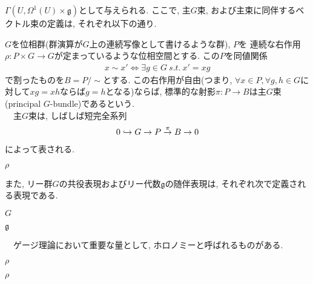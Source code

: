 $\Gamma(U, \Omega^1(U)\times \mathfrak{g})$として与えられる. 
ここで, 主$G$束, および主束に同伴するベクトル束の定義は, それぞれ以下の通り. 
\begin{definition}[主$G$束]
    $G$を位相群(群演算が$G$上の連続写像として書けるような群), $P$を
    連続な右作用$\rho: P\times G \to G$が定まっているような位相空間とする. 
    この$P$を同値関係
    \begin{align}
        x\sim x' \Leftrightarrow \exists g\in G~s.t. ~ x'=xg
    \end{align}
    で割ったものを$B=P/\sim $とする. 
    この右作用が自由(つまり, $\forall x\in P, 
    \forall g, h\in G$に対して$xg=xh$ならば$g=h$となる)ならば, 
    標準的な射影$\pi: P\to B$は主$G$束(principal $G$-bundle)であるという. \\
    　主$G$束は, しばしば短完全系列
    \begin{align}
        0\hookrightarrow G\to P\stackrel{\pi}{\to} B\to 0
    \label{pGbundle}
    \end{align}
    によって表される. 
\end{definition}
\begin{definition}[同伴ベクトル束]
    $\rho$
\end{definition}
また, リー群$G$の共役表現およびリー代数$\mathfrak{g}$の随伴表現は, それぞれ次で定義される表現である. 
\begin{definition}[共役表現]
    $G$
\end{definition}
\begin{definition}[随伴表現]
    $\mathfrak{g}$
\end{definition}
　ゲージ理論において重要な量として, ホロノミーと呼ばれるものがある. 
\begin{definition}[水平持ち上げ]
    $\rho$
\end{definition}
\begin{definition}[ホロノミー]
    $\rho$
\end{definition}
